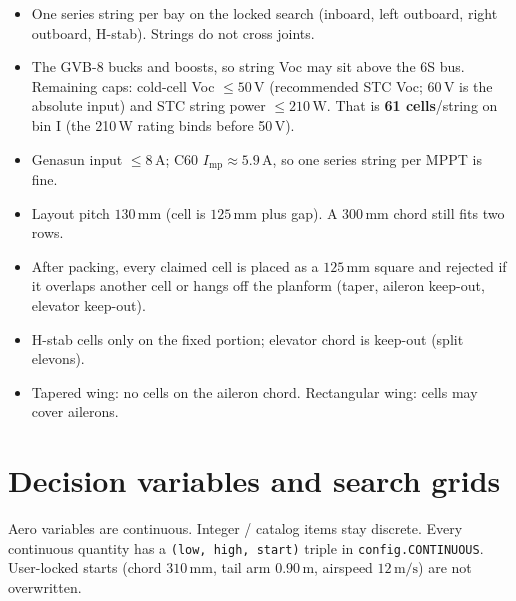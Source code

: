 \documentclass[11pt,letterpaper]{article}
\newcommand{\code}[1]{\texttt{#1}}
\begin{document}
\begin{itemize}
  \item One series string per bay on the locked search (inboard, left outboard, right outboard, H-stab). Strings do not cross joints.
  \item The GVB-8 bucks and boosts, so string Voc may sit above the 6S bus. Remaining caps: cold-cell Voc $\le 50\,\mathrm{V}$ (recommended STC Voc; 60\,V is the absolute input) and STC string power $\le 210\,\mathrm{W}$. That is \textbf{61 cells}/string on bin I (the 210\,W rating binds before 50\,V).
  \item Genasun input $\le 8\,\mathrm{A}$; C60 $I_\mathrm{mp} \approx 5.9\,\mathrm{A}$, so one series string per MPPT is fine.
  \item Layout pitch $130\,\mathrm{mm}$ (cell is $125\,\mathrm{mm}$ plus gap). A $300\,\mathrm{mm}$ chord still fits two rows.
  \item After packing, every claimed cell is placed as a $125\,\mathrm{mm}$ square and rejected if it overlaps another cell or hangs off the planform (taper, aileron keep-out, elevator keep-out).
  \item H-stab cells only on the fixed portion; elevator chord is keep-out (split elevons).
  \item Tapered wing: no cells on the aileron chord. Rectangular wing: cells may cover ailerons.
\end{itemize}

\section{Decision variables and search grids}

Aero variables are continuous. Integer / catalog items stay discrete. Every continuous quantity has a \texttt{(low, high, start)} triple in \code{config.CONTINUOUS}. User-locked starts (chord $310\,\mathrm{mm}$, tail arm $0.90\,\mathrm{m}$, airspeed $12\,\mathrm{m/s}$) are not overwritten.
\end{document}
